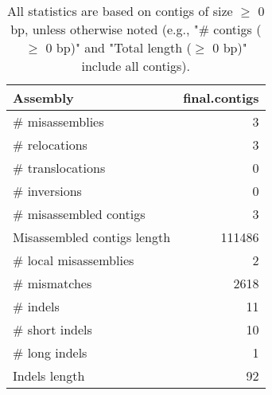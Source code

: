 \documentclass[12pt,a4paper]{article}
\begin{document}
\begin{table}[ht]
\begin{center}
\caption{All statistics are based on contigs of size $\geq$ 0 bp, unless otherwise noted (e.g., "\# contigs ($\geq$ 0 bp)" and "Total length ($\geq$ 0 bp)" include all contigs).}
\begin{tabular}{|l*{1}{|r}|}
\hline
Assembly & final.contigs \\ \hline
\# misassemblies & 3 \\ \hline
\hspace{5mm}\# relocations & 3 \\ \hline
\hspace{5mm}\# translocations & 0 \\ \hline
\hspace{5mm}\# inversions & 0 \\ \hline
\# misassembled contigs & 3 \\ \hline
Misassembled contigs length & 111486 \\ \hline
\# local misassemblies & 2 \\ \hline
\# mismatches & 2618 \\ \hline
\# indels & 11 \\ \hline
\hspace{5mm}\# short indels & 10 \\ \hline
\hspace{5mm}\# long indels & 1 \\ \hline
Indels length & 92 \\ \hline
\end{tabular}
\end{center}
\end{table}
\end{document}
